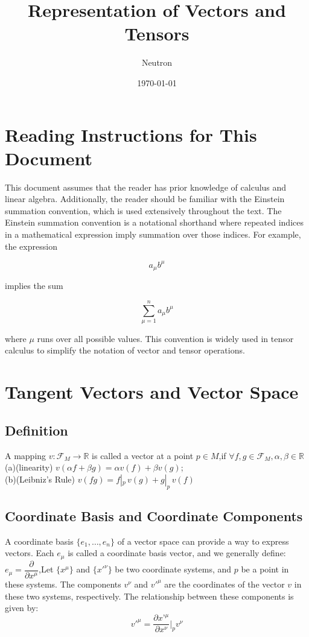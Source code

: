 \documentclass{article}
\title{Representation of Vectors and Tensors}
\author{Neutron}
\date{\today}
\begin{document}
\maketitle
\section*{Reading Instructions for This Document}

This document assumes that the reader has prior knowledge of calculus and linear algebra. Additionally, the reader should be familiar with the Einstein summation convention, which is used extensively throughout the text.
The Einstein summation convention is a notational shorthand where repeated indices in a mathematical expression imply summation over those indices. For example, the expression

\[
a_\mu b^\mu
\]

implies the sum

\[
\sum_{\mu=1}^n a_\mu b^\mu
\]

where \( \mu \) runs over all possible values. This convention is widely used in tensor calculus to simplify the notation of vector and tensor operations.

\section{Tangent Vectors and Vector Space}
\subsection{Definition}

A mapping \( v: \mathscr{F}_M \rightarrow \mathbb{R}\) is called a vector at a point \( p \in M \),if  \(\forall f,g \in \mathscr{F}_M , \alpha,\beta \in \mathbb{R}\)\\
(a)(linearity)  \(v(\alpha f+\beta g)=\alpha v(f)+\beta v(g)\);\\
(b)(Leibniz’s Rule)  \(v(fg)=f|_p \,v(g)+g|_p \,v(f)\)
\subsection{Coordinate Basis and Coordinate Components}

A coordinate basis \(\{e_1, \dots, e_n\}\) of a vector space can provide a way to express vectors. Each \(e_\mu\) is called a coordinate basis vector, and we generally define:\\
\(e_\mu = \dfrac{\partial}{\partial x^\mu}\),Let \(\{ x^\mu\} \) and \( \{x'^\nu\} \) be two coordinate systems, and \( p \) be a point in these systems. The components \( v^\nu \) and \( v'^\mu \) are the coordinates of the vector \( v \) in these two systems, respectively. The relationship between these components is given by:
\[
v'^\mu = \dfrac{\partial x’^\mu}{\partial x^\nu}\bigg|_p v^\nu 
\]
\end{document}
